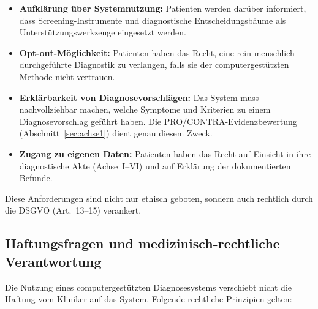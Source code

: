 \documentclass[11pt,a4paper]{article}
\begin{document}
\begin{itemize}[noitemsep]
\item \textbf{Aufkl\"arung \"uber Systemnutzung:} Patienten werden dar\"uber informiert, dass Screening-Instrumente und diagnostische Entscheidungsb\"aume als Unterst\"utzungswerkzeuge eingesetzt werden.
\item \textbf{Opt-out-M\"oglichkeit:} Patienten haben das Recht, eine rein menschlich durchgef\"uhrte Diagnostik zu verlangen, falls sie der computergest\"utzten Methode nicht vertrauen.
\item \textbf{Erkl\"arbarkeit von Diagnosevorschl\"agen:} Das System muss nachvollziehbar machen, welche Symptome und Kriterien zu einem Diagnosevorschlag gef\"uhrt haben. Die PRO/CONTRA-Evidenzbewertung (Abschnitt~\ref{sec:achse1}) dient genau diesem Zweck.
\item \textbf{Zugang zu eigenen Daten:} Patienten haben das Recht auf Einsicht in ihre diagnostische Akte (Achse~I--VI) und auf Erkl\"arung der dokumentierten Befunde.
\end{itemize}

Diese Anforderungen sind nicht nur ethisch geboten, sondern auch rechtlich durch die DSGVO (Art.~13--15) verankert.

\subsection{Haftungsfragen und medizinisch-rechtliche Verantwortung}

Die Nutzung eines computergest\"utzten Diagnosesystems verschiebt nicht die Haftung vom Kliniker auf das System. Folgende rechtliche Prinzipien gelten:
\end{document}
